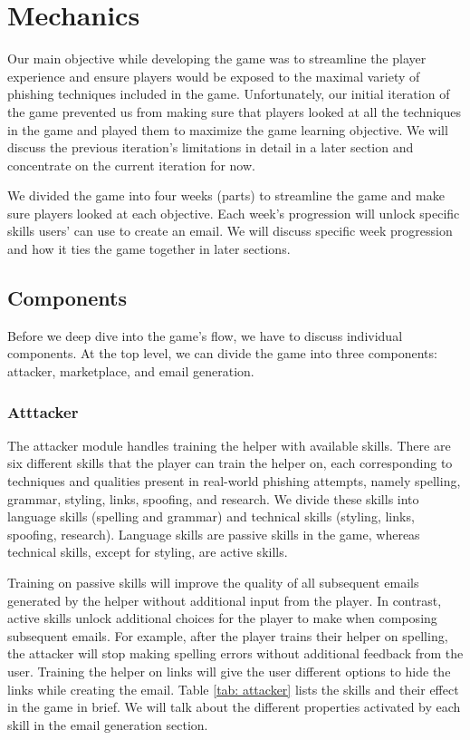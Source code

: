 \section{Mechanics}
Our main objective while developing the game was to streamline the player experience and ensure players would be exposed to the maximal variety of phishing techniques included in the game. Unfortunately, our initial iteration of the game prevented us from making sure that players looked at all the techniques in the game and played them to maximize the game learning objective. We will discuss the previous iteration's limitations in detail in a later section and concentrate on the current iteration for now.

We divided the game into four weeks (parts) to streamline the game and make sure players looked at each objective. Each week's progression will unlock specific skills users' can use to create an email. We will discuss specific week progression and how it ties the game together in later sections.

\subsection{Components}
Before we deep dive into the game's flow, we have to discuss individual components. At the top level, we can divide the game into three components: attacker, marketplace, and email generation.

\subsubsection{Atttacker}
The attacker module handles training the helper with available skills. There are six different skills that the player can train the helper on, each corresponding to techniques and qualities present in real-world phishing attempts, namely spelling, grammar, styling, links, spoofing, and research. We divide these skills into language skills (spelling and grammar) and technical skills (styling, links, spoofing, research). Language skills are passive skills in the game, whereas technical skills, except for styling, are active skills.

Training on passive skills will improve the quality of all subsequent emails generated by the helper without additional input from the player. In contrast, active skills unlock additional choices for the player to make when composing subsequent emails. For example, after the player trains their helper on spelling, the attacker will stop making spelling errors without additional feedback from the user. Training the helper on links will give the user different options to hide the links while creating the email. Table \ref{tab: attacker} lists the skills and their effect in the game in brief. We will talk about the different properties activated by each skill in the email generation section.

